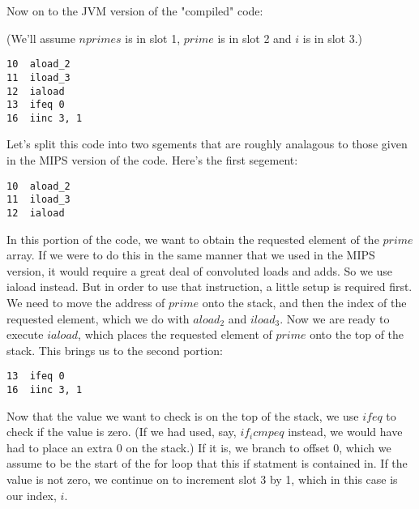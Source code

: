\documentclass[11pt]{article}
\begin{document}

Now on to the JVM version of the "compiled" code:

(We'll assume $nprimes$ is in slot 1, $prime$ is in slot 2 and $i$ is in slot 3.)

\begin{verbatim}
10  aload_2
11  iload_3
12  iaload
13  ifeq 0
16  iinc 3, 1
\end{verbatim}

Let's split this code into two sgements that are roughly analagous to those given in the MIPS version of the code. Here's the first segement:

\begin{verbatim}
10  aload_2
11  iload_3
12  iaload
\end{verbatim}

In this portion of the code, we want to obtain the requested element of the $prime$ array. If we were to do this in the same manner that we used in the MIPS version, it would require a great deal of convoluted loads and adds. So we use iaload instead. But in order to use that instruction, a little setup is required first. We need to move the address of $prime$ onto the stack, and then the index of the requested element, which we do with $aload_2$ and $iload_3$. Now we are ready to execute $iaload$, which places the requested element of $prime$ onto the top of the stack. This brings us to the second portion:

\begin{verbatim}
13  ifeq 0
16  iinc 3, 1
\end{verbatim}

Now that the value we want to check is on the top of the stack, we use $ifeq$ to check if the value is zero. (If we had used, say, $if_icmpeq$ instead, we would have had to place an extra 0 on the stack.) If it is, we branch to offset 0, which we assume to be the start of the for loop that this if statment is contained in. If the value is not zero, we continue on to increment slot 3 by 1, which in this case is our index, $i$.
\end{document}
